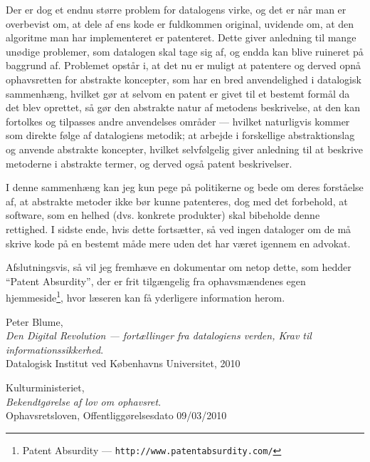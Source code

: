 \documentclass[a4paper]{article}
\begin{document}
Der er dog et endnu større problem for datalogens virke, og det er når man er
overbevist om, at dele af ens kode er fuldkommen original, uvidende om, at den
algoritme man har implementeret er patenteret. Dette giver anledning til mange
unødige problemer, som datalogen skal tage sig af, og endda kan blive ruineret
på baggrund af. Problemet opstår i, at det nu er muligt at patentere og derved
opnå ophavsretten for abstrakte koncepter, som har en bred anvendelighed i
datalogisk sammenhæng, hvilket gør at selvom en patent er givet til et bestemt
formål da det blev oprettet, så gør den abstrakte natur af metodens
beskrivelse, at den kan fortolkes og tilpasses andre anvendelses områder ---
hvilket naturligvis kommer som direkte følge af datalogiens metodik; at
arbejde i forskellige abstraktionslag og anvende abstrakte koncepter, hvilket
selvfølgelig giver anledning til at beskrive metoderne i abstrakte termer, og
derved også patent beskrivelser.

I denne sammenhæng kan jeg kun pege på politikerne og bede om deres forståelse
af, at abstrakte metoder ikke bør kunne patenteres, dog med det forbehold, at
software, som en helhed (dvs. konkrete produkter) skal bibeholde denne
rettighed. I sidste ende, hvis dette fortsætter, så ved ingen dataloger om de
må skrive kode på en bestemt måde mere uden det har været igennem en advokat.

Afslutningsvis, så vil jeg fremhæve en dokumentar om netop dette, som hedder
``Patent Absurdity'', der er frit tilgængelig fra ophavsmændenes egen
hjemmeside\footnote{Patent Absurdity ---
{\tt http://www.patentabsurdity.com/}}, hvor læseren kan få yderligere
information herom.

\newpage
\begin{thebibliography}{9}

	Peter Blume, \\
	\emph{Den Digital Revolution --- fortællinger fra datalogiens verden,
	Krav til informationssikkerhed}. \\
	Datalogisk Institut ved Københavns Universitet, 2010

	Kulturministeriet, \\
	\emph{Bekendtgørelse af lov om ophavsret}. \\
	Ophavsretsloven, Offentliggørelsesdato 09/03/2010

\end{thebibliography}
\end{document}
